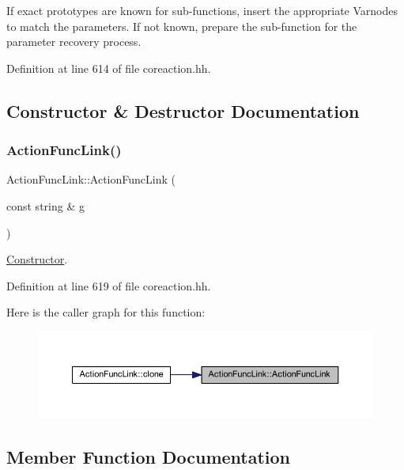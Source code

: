 If exact prototypes are known for sub-\/functions, insert the appropriate Varnodes to match the parameters. If not known, prepare the sub-\/function for the parameter recovery process. 

Definition at line 614 of file coreaction.\+hh.



\subsection{Constructor \& Destructor Documentation}
\mbox{\label{class_action_func_link_a7343d5597b3978a9f4221894d29139b6}} 
\subsubsection{\texorpdfstring{ActionFuncLink()}{ActionFuncLink()}}
{\footnotesize\ttfamily Action\+Func\+Link\+::\+Action\+Func\+Link (\begin{DoxyParamCaption}\item[{const string \&}]{g }\end{DoxyParamCaption})\hspace{0.3cm}{\ttfamily [inline]}}



\mbox{\hyperlink{class_constructor}{Constructor}}. 



Definition at line 619 of file coreaction.\+hh.

Here is the caller graph for this function\+:
\nopagebreak
\begin{figure}[H]
\begin{center}
\leavevmode
\includegraphics[width=350pt]{class_action_func_link_a7343d5597b3978a9f4221894d29139b6_icgraph}
\end{center}
\end{figure}


\subsection{Member Function Documentation}
\mbox{\label{class_action_func_link_aea1b5a423e2affec2131468fc23a6a3e}} 
